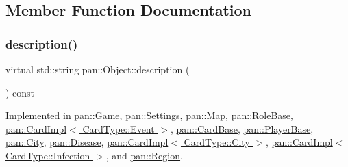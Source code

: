 \subsection{Member Function Documentation}
\mbox{\label{classpan_1_1_object_a2bb6d3117bb32f5774657c83f118ed8b}} 
\subsubsection{\texorpdfstring{description()}{description()}}
{\footnotesize\ttfamily virtual std\+::string pan\+::\+Object\+::description (\begin{DoxyParamCaption}{ }\end{DoxyParamCaption}) const\hspace{0.3cm}{\ttfamily [pure virtual]}}



Implemented in \hyperlink{classpan_1_1_game_a463480ea3f29b34629059134c416ffa0}{pan\+::\+Game}, \hyperlink{classpan_1_1_settings_ac88db54a696993babc9c495d54fc89c3}{pan\+::\+Settings}, \hyperlink{classpan_1_1_map_a9d08be170f445bbef11ea0d38ba8c531}{pan\+::\+Map}, \hyperlink{classpan_1_1_role_base_a6f4774e52750478d865c4627fc4d4460}{pan\+::\+Role\+Base}, \hyperlink{classpan_1_1_card_impl_3_01_card_type_1_1_event_01_4_aa5c7d2729e0bfb141a0d8487a590a580}{pan\+::\+Card\+Impl$<$ Card\+Type\+::\+Event $>$}, \hyperlink{classpan_1_1_card_base_ad004c502404a958eaf4ecae7e73cc8cf}{pan\+::\+Card\+Base}, \hyperlink{classpan_1_1_player_base_a9b3e10457a0d749d97d91b6461882ac6}{pan\+::\+Player\+Base}, \hyperlink{classpan_1_1_city_a0232df988764b10f50570e335e8237c2}{pan\+::\+City}, \hyperlink{classpan_1_1_disease_a56ea3e8918baf355ad2d1aa253fd9f65}{pan\+::\+Disease}, \hyperlink{classpan_1_1_card_impl_3_01_card_type_1_1_city_01_4_a326c3eaac225bd758f19abb152deffe4}{pan\+::\+Card\+Impl$<$ Card\+Type\+::\+City $>$}, \hyperlink{classpan_1_1_card_impl_3_01_card_type_1_1_infection_01_4_a5e31904120b655ce59633433a4d4c17c}{pan\+::\+Card\+Impl$<$ Card\+Type\+::\+Infection $>$}, and \hyperlink{classpan_1_1_region_abc67a788365510bfad231939713106cb}{pan\+::\+Region}.

\mbox{\label{classpan_1_1_object_aa69aa8f0aaf6b5b1cd8cd574a00b5b56}} 
